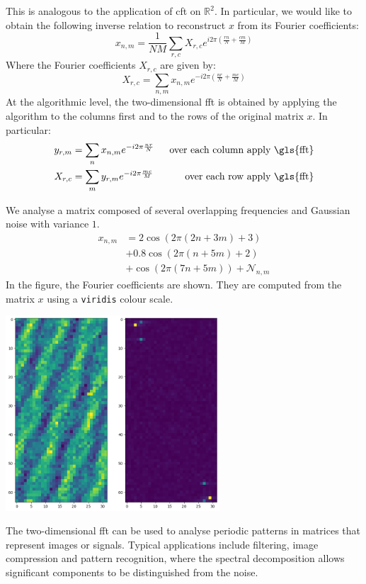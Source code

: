 \begin{toReview}
\noindent This is analogous to the application of \gls{cft} on $\mathbb{R}^2$. In particular, we would like to obtain the following inverse relation to reconstruct $x$ from its Fourier coefficients:
\begin{equation}
	x_{n,m} = \frac{1}{NM}\sum_{r,c} X_{r,c} e^{i2\pi\left(\frac{rn}{N} + \frac{cm}{M}\right)}
\end{equation}
Where the Fourier coefficients $X_{r,c}$ are given by:
\begin{equation}
	X_{r,c} = \sum_{n,m} x_{n,m}e^{-i2\pi\left(\frac{nr}{N} + \frac{mc}{M}\right)}
\end{equation}
At the algorithmic level, the two-dimensional \gls{fft} is obtained by applying the algorithm to the columns first and to the rows of the original matrix $x$. In particular:
\begin{align*}
	y_{r,m} &= \sum_{n} x_{n,m}e^{-i2\pi\frac{nr}{N}} & \;\;\text{over each column apply \gls{fft}}\\
	X_{r,c} &=\sum_{m}y_{r,m}e^{-i2\pi\frac{mc}{M}} & \;\;\text{over each row apply \gls{fft}}
\end{align*}
\begin{exempli_gratia}
	We analyse a matrix composed of several overlapping frequencies and Gaussian noise with variance $1$.
	\begin{align*}
	x_{n,m} &= 2\cos\left(2\pi(2n + 3m) + 3\right) \\
	&+ 0.8\cos\left(2\pi(n + 5m) + 2\right) \\
	&+ \cos\left(2\pi(7n + 5m)\right) + \mathcal{N}_{n,m}
	\end{align*}
	In the figure, the Fourier coefficients are shown. They are computed from the matrix $x$ using a \texttt{viridis} colour scale.
	\begin{center}
		\centering \includegraphics[width=0.6\textwidth]{Figures/fft2d_example.png}
	\end{center}
\end{exempli_gratia}

\noindent The two-dimensional \gls{fft} can be used to analyse periodic patterns in matrices that represent images or signals. Typical applications include filtering, image compression and pattern recognition, where the spectral decomposition allows significant components to be distinguished from the noise.
\end{toReview}
